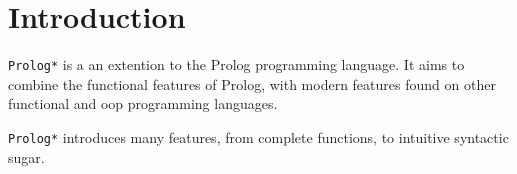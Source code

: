 \section{Introduction}

\texttt{Prolog*} is a an extention to the Prolog programming language. It aims to
combine the functional features of Prolog, with modern features found on
other functional and oop programming languages.

\texttt{Prolog*} introduces many features, from complete functions, to
intuitive syntactic sugar.








